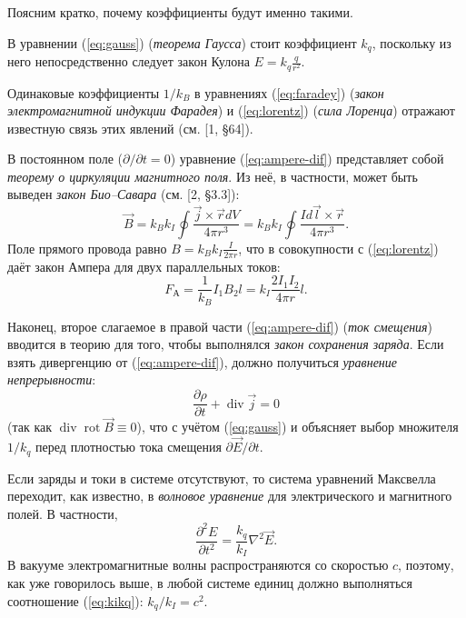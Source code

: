 Поясним кратко, почему коэффициенты будут именно такими.

В уравнении (\ref{eq:gauss}) (\emph{теорема Гаусса}) стоит коэффициент $k_q$,
поскольку из него непосредственно следует закон Кулона $E=k_{q}\frac{q}{r^{2}}$.

Одинаковые коэффициенты $1/k_{B}$ в уравнениях (\ref{eq:faradey})
(\emph{закон электромагнитной индукции Фарадея}) и (\ref{eq:lorentz})
(\emph{сила Лоренца}) отражают известную связь этих явлений
(см. [1, \S64]).

В постоянном поле ($\partial/\partial t=0$) уравнение (\ref{eq:ampere-dif})
представляет собой \emph{теорему о циркуляции магнитного поля}. Из
неё, в частности, может быть выведен \emph{закон Био--Савара}
 (см. [2, \S3.3]):
\[
\vec{B}=k_{B}k_{I}\oint\frac{\vec{j}\times\vec{r}dV}{4\pi r^{3}}=k_{B}k_{I}\oint\frac{Id\vec{l}\times\vec{r}}{4\pi r^{3}}.
\]
Поле прямого провода равно $B=k_{B}k_{I}\frac{I}{2\pi r}$, что в
совокупности с (\ref{eq:lorentz}) даёт закон Ампера для двух параллельных
токов:
\[
F_{\text{А}}=\frac{1}{k_{B}}I_{1}B_{2}l=k_{I}\frac{2I_{1}I_{2}}{4\pi r}l.
\]

Наконец, второе слагаемое в правой части (\ref{eq:ampere-dif}) (\emph{ток
смещения}) вводится в теорию для того, чтобы выполнялся
\emph{закон сохранения заряда}. Если взять дивергенцию от (\ref{eq:ampere-dif}),
должно получиться \emph{уравнение непрерывности}:
\[
\frac{\partial\rho}{\partial t}+\mathop{\mathrm{div}}\vec{j}=0
\]
(так как $\mathop{\mathrm{div}}\mathop{\mathrm{rot}}\vec{B}\equiv 0$),
что с учётом (\ref{eq:gauss}) и объясняет выбор множителя~$1/k_{q}$
перед плотностью тока смещения $\partial{\vec E}/\partial{t}$.

Если заряды и токи в системе отсутствуют, то система уравнений Максвелла
переходит, как известно, в \emph{волновое уравнение} для электрического
и магнитного полей. В частности,
\[
\frac{\partial^{2}E}{\partial t^{2}}=\frac{k_{q}}{k_{I}}\nabla^{2}\vec{E}.
\]
В вакууме электромагнитные волны распространяются со скоростью $c$,
поэтому, как уже говорилось выше, в любой системе единиц должно выполняться
соотношение (\ref{eq:kikq}): $k_{q}/k_{I}=c^{2}$.


